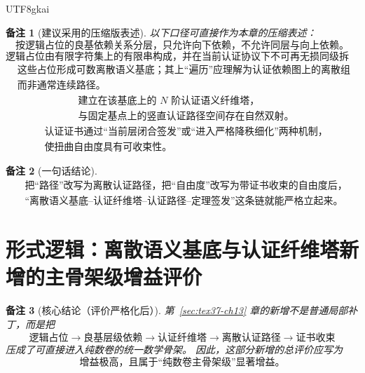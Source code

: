 \documentclass[12pt]{article}
\newtheorem{remark}{备注}[section]
\begin{document}
\begin{CJK*}{UTF8}{gkai}
\begin{remark}[建议采用的压缩版表述]
以下口径可直接作为本章的压缩表述：
\[
  \boxed{
    \text{按逻辑占位的良基依赖关系分层，只允许向下依赖，不允许同层与向上依赖。}
  }
\]
\[
  \boxed{
    \text{逻辑占位由有限字符集上的有限串构成，并在当前认证协议下不可再无损同级拆分。}
  }
\]
\[
  \boxed{
    \begin{aligned}
      &\text{这些占位形成可数离散语义基底；其上“遍历”应理解为认证依赖图上的离散组合路径，}\\
      &\text{而非通常连续路径。}
    \end{aligned}
  }
\]
\[
  \boxed{
    \begin{aligned}
      &\text{建立在该基底上的 }N\text{ 阶认证语义纤维塔，}\\
      &\text{与固定基点上的竖直认证路径空间存在自然双射。}
    \end{aligned}
  }
\]
\[
  \boxed{
    \begin{aligned}
      &\text{认证证书通过“当前层闭合签发”或“进入严格降秩细化”两种机制，}\\
      &\text{使扭曲自由度具有可收束性。}
    \end{aligned}
  }
\]
\end{remark}

\begin{remark}[一句话结论]
\[
  \boxed{
    \begin{aligned}
      &\text{把“路径”改写为离散认证路径，把“自由度”改写为带证书收束的自由度后，}\\
      &\text{“离散语义基底--认证纤维塔--认证路径--定理签发”这条链就能严格立起来。}
    \end{aligned}
  }
\]
\end{remark}

\clearpage

\section{形式逻辑：离散语义基底与认证纤维塔新增的主骨架级增益评价}
\label{sec:tex37-ch14}

\begin{remark}[核心结论（评价严格化后）]
第~\ref{sec:tex37-ch13} 章的新增不是普通局部补丁，而是把
\[
  \text{逻辑占位}
  \to
  \text{良基层级依赖}
  \to
  \text{认证纤维塔}
  \to
  \text{离散认证路径}
  \to
  \text{证书收束}
\]
压成了可直接进入纯数卷的统一数学骨架。
因此，这部分新增的总评价应写为
\[
  \boxed{
    \text{增益极高，且属于“纯数卷主骨架级”显著增益。}
  }
\]
\end{remark}


\end{CJK*}
\end{document}
